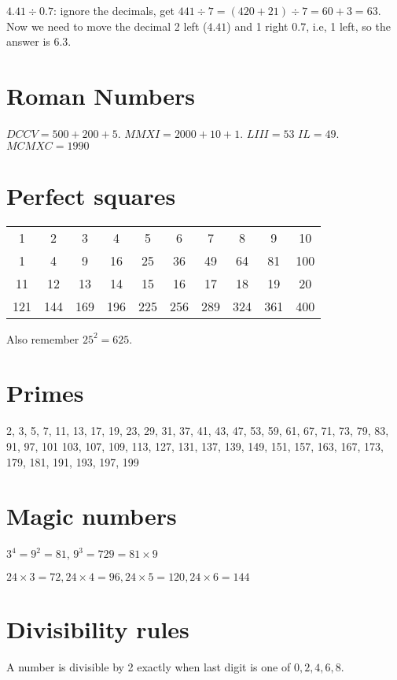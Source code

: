 \documentclass[fullpage,twocolumn]{article}
\begin{document}
$4.41 \div 0.7$: ignore the decimals, get $441\div 7 = (420 + 21) \div 7 = 60 + 3 = 63$.
Now we need to move the decimal 2 left ($4.41$) and 1 right $0.7$, i.e, 1 left,
so the answer is $6.3$.

\section{Roman Numbers}

$DCCV = 500 + 200 + 5$. $MMXI = 2000 + 10  + 1$. $LIII = 53$ $IL = 49$. $MCMXC = 1990$



\section{Perfect squares}
{\tiny
\begin{tabular}{|c|c|c|c|c|c|c|c|c|c|} \hline
1 & 2 & 3 & 4 & 5 & 6 & 7 & 8 & 9 & 10 \\ 
1 & 4 & 9 & 16 & 25 & 36 & 49 & 64 & 81 & 100 \\ \hline
11 & 12 & 13 & 14 & 15 & 16 & 17 & 18 & 19 & 20 \\ 
121 & 144 & 169 & 196 & 225 & 256 & 289 & 324 & 361 & 400 \\ \hline
\end{tabular}
}

Also remember $25^2 = 625$.

\section{Primes}
2, 3, 5, 7, 11, 13, 17, 19, 23, 29, 31, 37, 41, 43, 47, 53, 59, 61, 67, 71, 73, 79, 83, 91, 97, 101    103, 107, 109, 113, 127, 131, 137, 139, 149, 151, 157, 163, 167, 173, 179, 181, 191, 193, 197, 199

\section{Magic numbers}
$3^4 = 9^2 = 81$, $9^3 = 729 = 81 \times 9$

$24 \times 3 = 72, 24 \times 4 = 96, 24  \times 5 = 120, 24 \times 6 = 144$

\section{Divisibility rules}

A number is divisible by 2 exactly when last digit is one of $0,2,4,6,8$.
\end{document}
